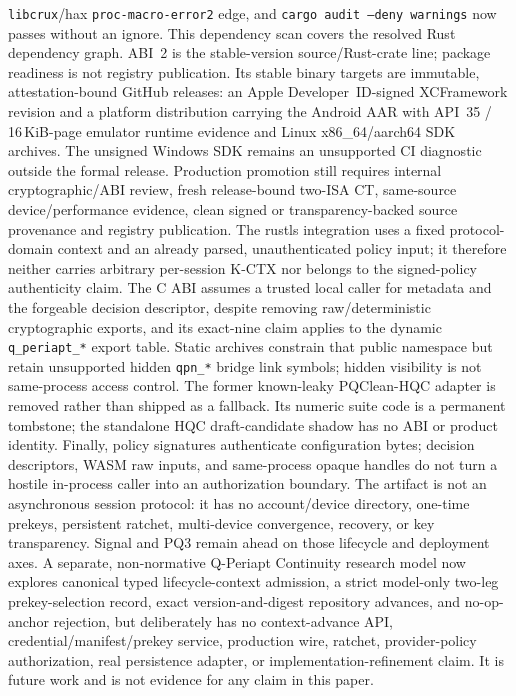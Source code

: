 \documentclass[journal]{IEEEtran}
\newcommand{\code}[1]{\texttt{\small #1}}
\begin{document}
\code{libcrux}/hax \code{proc-macro-error2} edge, and \code{cargo audit --deny warnings} now passes
without an ignore. This dependency scan covers the resolved Rust dependency graph.
ABI~2 is the stable-version source/Rust-crate line; package readiness is not registry
publication. Its stable binary targets are immutable, attestation-bound GitHub releases:
an Apple Developer~ID-signed XCFramework
revision and a platform distribution carrying the Android AAR with API~35 / 16\,KiB-page emulator
runtime evidence and Linux x86\_64/aarch64 SDK archives. The unsigned Windows SDK
remains an unsupported CI diagnostic outside the formal release. Production promotion still requires internal cryptographic/ABI review, fresh
release-bound two-ISA CT, same-source device/performance evidence, clean
signed or transparency-backed source provenance and registry publication. The rustls integration uses a fixed protocol-domain context and an already parsed,
unauthenticated policy input; it therefore neither carries arbitrary per-session K-CTX nor belongs to
the signed-policy authenticity claim. The C ABI assumes a trusted local caller for metadata and the
forgeable decision descriptor, despite removing raw/deterministic cryptographic exports,
and its exact-nine claim applies to the dynamic \code{q\_periapt\_*} export table.
Static archives constrain that public namespace but retain unsupported hidden
\code{qpn\_*} bridge link symbols; hidden visibility is not same-process access control.
The former known-leaky PQClean-HQC adapter is removed rather than shipped as a fallback.
Its numeric suite code is a permanent tombstone; the standalone HQC draft-candidate shadow has no
ABI or product identity. Finally, policy signatures authenticate configuration bytes; decision descriptors,
WASM raw inputs, and
same-process opaque handles do not turn a hostile in-process caller into an authorization boundary.
The artifact is not an asynchronous session protocol: it has no account/device directory, one-time
prekeys, persistent ratchet, multi-device convergence, recovery, or key transparency. Signal and
PQ3 remain ahead on those lifecycle and deployment axes. A separate, non-normative Q-Periapt
Continuity research model now explores canonical typed lifecycle-context admission, a strict
model-only two-leg prekey-selection record, exact version-and-digest repository advances, and
no-op-anchor rejection, but deliberately has no context-advance API, credential/manifest/prekey
service, production wire, ratchet,
provider-policy authorization, real persistence adapter, or
implementation-refinement claim. It is future work
and is not evidence for any claim in this paper.
\end{document}
